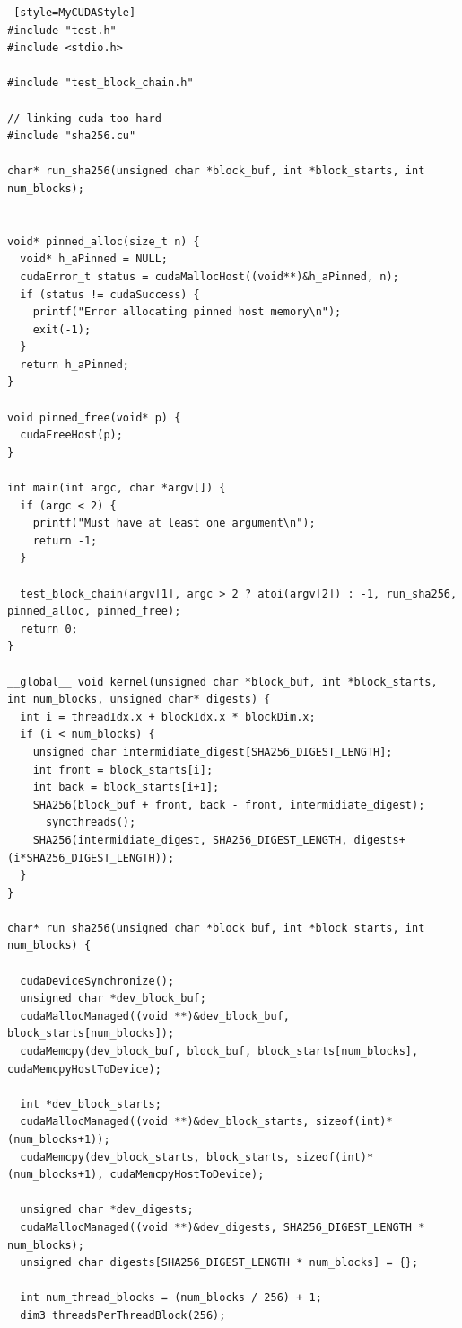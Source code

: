 \documentclass{article}
\begin{document}
\begin{lstlisting} [style=MyCUDAStyle]
#include "test.h"
#include <stdio.h>

#include "test_block_chain.h"

// linking cuda too hard
#include "sha256.cu"

char* run_sha256(unsigned char *block_buf, int *block_starts, int num_blocks);


void* pinned_alloc(size_t n) {
  void* h_aPinned = NULL;
  cudaError_t status = cudaMallocHost((void**)&h_aPinned, n);
  if (status != cudaSuccess) {
    printf("Error allocating pinned host memory\n");
    exit(-1);
  }
  return h_aPinned;
}

void pinned_free(void* p) {
  cudaFreeHost(p);
}

int main(int argc, char *argv[]) {
  if (argc < 2) {
    printf("Must have at least one argument\n");
    return -1;
  }

  test_block_chain(argv[1], argc > 2 ? atoi(argv[2]) : -1, run_sha256, pinned_alloc, pinned_free);
  return 0;
}

__global__ void kernel(unsigned char *block_buf, int *block_starts, int num_blocks, unsigned char* digests) {
  int i = threadIdx.x + blockIdx.x * blockDim.x;
  if (i < num_blocks) {
    unsigned char intermidiate_digest[SHA256_DIGEST_LENGTH];
    int front = block_starts[i];
    int back = block_starts[i+1];
    SHA256(block_buf + front, back - front, intermidiate_digest);
    __syncthreads();
    SHA256(intermidiate_digest, SHA256_DIGEST_LENGTH, digests+(i*SHA256_DIGEST_LENGTH));
  }
}

char* run_sha256(unsigned char *block_buf, int *block_starts, int num_blocks) {

  cudaDeviceSynchronize();
  unsigned char *dev_block_buf;
  cudaMallocManaged((void **)&dev_block_buf, block_starts[num_blocks]);
  cudaMemcpy(dev_block_buf, block_buf, block_starts[num_blocks], cudaMemcpyHostToDevice);

  int *dev_block_starts;
  cudaMallocManaged((void **)&dev_block_starts, sizeof(int)*(num_blocks+1));
  cudaMemcpy(dev_block_starts, block_starts, sizeof(int)*(num_blocks+1), cudaMemcpyHostToDevice);

  unsigned char *dev_digests;
  cudaMallocManaged((void **)&dev_digests, SHA256_DIGEST_LENGTH * num_blocks);
  unsigned char digests[SHA256_DIGEST_LENGTH * num_blocks] = {};

  int num_thread_blocks = (num_blocks / 256) + 1;
  dim3 threadsPerThreadBlock(256);


\end{lstlisting}
\end{document}
